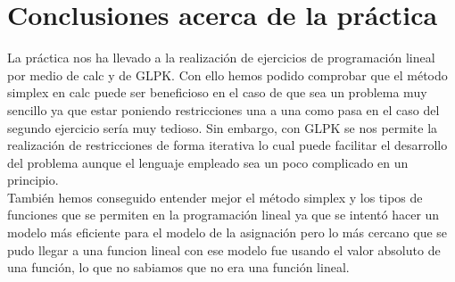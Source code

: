 \documentclass[11pt,spanish]{article}
\begin{document}
	\section{Conclusiones acerca de la práctica}
	La práctica nos ha llevado a la realización de ejercicios de programación lineal por medio de calc y de GLPK. Con ello hemos podido comprobar que el método simplex en calc puede ser beneficioso en el caso de que sea un problema muy sencillo ya que estar poniendo restricciones una a una como pasa en el caso del segundo ejercicio sería muy tedioso. Sin embargo, con GLPK se nos permite la realización de restricciones de forma iterativa lo cual puede facilitar el desarrollo del problema aunque el lenguaje empleado sea un poco complicado en un principio.\\
	También hemos conseguido entender mejor el método simplex y los tipos de funciones que se permiten en la programación lineal ya que se intentó hacer un modelo más eficiente para el modelo de la asignación pero lo más cercano que se pudo llegar a una funcion lineal con ese modelo fue usando el valor absoluto de una función, lo que no sabiamos que no era una función lineal.
	\newpage
\end{document}
